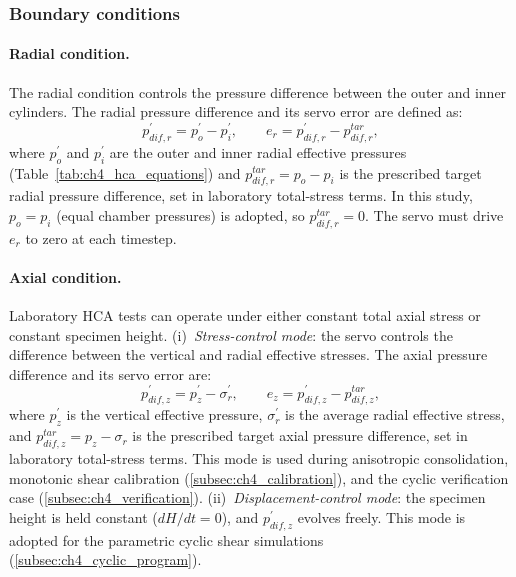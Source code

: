 \documentclass[../main]{subfiles}
\begin{document}
\subsubsection{Boundary conditions}

\paragraph{Radial condition.}
The radial condition controls the pressure difference between the outer and inner cylinders. The radial pressure difference and its servo error are defined as:
\begin{equation}
p_{dif,r}^{\prime} = p_o^{\prime} - p_i^{\prime}, \qquad e_r = p_{dif,r}^{\prime} - p_{dif,r}^{tar},
\label{eq:ch4_cond1_radial}
\end{equation}
where $p_o^{\prime}$ and $p_i^{\prime}$ are the outer and inner radial effective pressures (Table~\ref{tab:ch4_hca_equations}) and $p_{dif,r}^{tar}=p_o-p_i$ is the prescribed target radial pressure difference, set in laboratory total-stress terms. In this study, $p_o = p_i$ (equal chamber pressures) is adopted, so $p_{dif,r}^{tar} = 0$. The servo must drive $e_r$ to zero at each timestep.

\paragraph{Axial condition.}
Laboratory HCA tests can operate under either constant total axial stress or constant specimen height.
(i)~\emph{Stress-control mode}: the servo controls the difference between the vertical and radial effective stresses. The axial pressure difference and its servo error are:
\begin{equation}
p_{dif,z}^{\prime} = p_z^{\prime} - \sigma_r^{\prime}, \qquad e_z = p_{dif,z}^{\prime} - p_{dif,z}^{tar},
\label{eq:ch4_cond2_axial}
\end{equation}
where $p_z^{\prime}$ is the vertical effective pressure, $\sigma_r^{\prime}$ is the average radial effective stress, and $p_{dif,z}^{tar}=p_z-\sigma_r$ is the prescribed target axial pressure difference, set in laboratory total-stress terms. This mode is used during anisotropic consolidation, monotonic shear calibration (\cref{subsec:ch4_calibration}), and the cyclic verification case (\cref{subsec:ch4_verification}).
(ii)~\emph{Displacement-control mode}: the specimen height is held constant ($dH/dt=0$), and $p_{dif,z}^{\prime}$ evolves freely. This mode is adopted for the parametric cyclic shear simulations (\cref{subsec:ch4_cyclic_program}).
\end{document}
